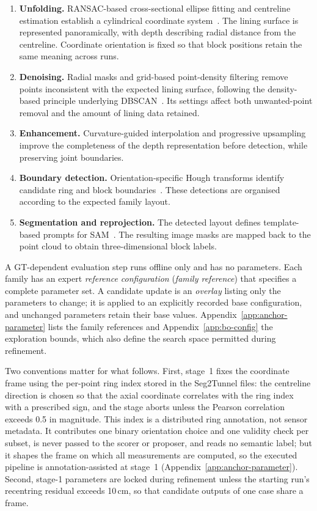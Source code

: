 \documentclass[a4paper,fleqn]{cas-dc}
\begin{document}
\begin{enumerate}
\item \textbf{Unfolding.}
RANSAC-based cross-sectional ellipse fitting and centreline estimation establish a cylindrical coordinate system~\cite{fischler1981ransac}. The lining surface is represented panoramically, with depth describing radial distance from the centreline. Coordinate orientation is fixed so that block positions retain the same meaning across runs.

\item \textbf{Denoising.}
Radial masks and grid-based point-density filtering remove points inconsistent with the expected lining surface, following the density-based principle underlying DBSCAN~\cite{ester1996dbscan}. Its settings affect both unwanted-point removal and the amount of lining data retained.

\item \textbf{Enhancement.}
Curvature-guided interpolation and progressive upsampling improve the completeness of the depth representation before detection, while preserving joint boundaries.

\item \textbf{Boundary detection.}
Orientation-specific Hough transforms identify candidate ring and block boundaries~\cite{duda1972hough}. These detections are organised according to the expected family layout.

\item \textbf{Segmentation and reprojection.}
The detected layout defines template-based prompts for SAM~\cite{kirillov2023sam}. The resulting image masks are mapped back to the point cloud to obtain three-dimensional block labels.
\end{enumerate}

A GT-dependent evaluation step runs offline only and has no parameters. Each family has an expert \emph{reference configuration} (\emph{family reference}) that specifies a complete parameter set. A candidate update is an \emph{overlay} listing only the parameters to change; it is applied to an explicitly recorded base configuration, and unchanged parameters retain their base values. Appendix~\ref{app:anchor-parameter} lists the family references and Appendix~\ref{app:bo-config} the exploration bounds, which also define the search space permitted during refinement.

Two conventions matter for what follows. First, stage~1 fixes the coordinate frame using the per-point ring index stored in the Seg2Tunnel files: the centreline direction is chosen so that the axial coordinate correlates with the ring index with a prescribed sign, and the stage aborts unless the Pearson correlation exceeds 0.5 in magnitude. This index is a distributed ring annotation, not sensor metadata. It contributes one binary orientation choice and one validity check per subset, is never passed to the scorer or proposer, and reads no semantic label; but it shapes the frame on which all measurements are computed, so the executed pipeline is annotation-assisted at stage~1 (Appendix~\ref{app:anchor-parameter}). Second, stage-1 parameters are locked during refinement unless the starting run's recentring residual exceeds 10\,cm, so that candidate outputs of one case share a frame.
\end{document}
